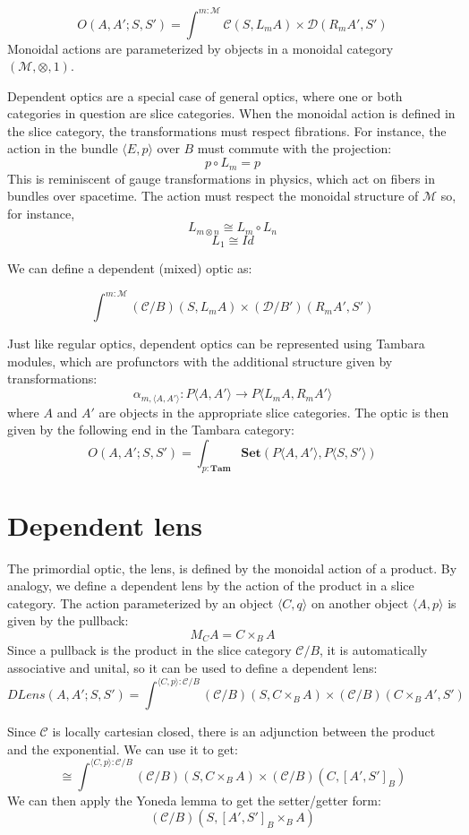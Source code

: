 \documentclass[11pt]{amsart}
\begin{document}
\[ O(A, A'; S, S') =  \int^{m \colon \mathcal{M}} \mathcal{C}( S, L_m A) \times \mathcal{D}(R_m A', S') \]
Monoidal actions are parameterized by objects in a monoidal category $(\mathcal{M}, \otimes, 1)$.

Dependent optics are a special case of general optics, where one or both categories in question are slice categories. When the monoidal action is defined in the slice category, the transformations must respect fibrations. For instance, the action in the bundle $\langle E, p \rangle$ over $B$ must commute with the projection:
\[p \circ L_m = p \]
This is reminiscent of gauge transformations in physics, which act on fibers in bundles over spacetime. The action must respect the monoidal structure of $\mathcal{M}$ so, for instance,
\[L_{m \otimes n} \cong L_m \circ L_n \]
\[ L_1 \cong \mathit{Id} \]

We can define a dependent (mixed) optic as:

\[ \int^{m : \mathcal{M}} (\mathcal{C}/B)( S, L_m A) \times (\mathcal{D}/B')(R_m A', S') \]

Just like regular optics, dependent optics can be represented using Tambara modules, which are profunctors with the additional structure given by transformations:
\[ \alpha_{m, \langle A, A' \rangle} \colon P \langle A, A' \rangle \to P\langle L_m A, R_m A' \rangle \]
where $A$ and $A'$ are objects in the appropriate slice categories.
The optic is then given by the following end in the Tambara category:
\[ O(A, A'; S, S') =  \int_{p : \mathbf{Tam}} \mathbf{Set}(P \langle A, A' \rangle, P \langle S, S' \rangle) \]


\section{Dependent lens}

The primordial optic, the lens, is defined by the monoidal action of a product. By analogy, we define a dependent lens by the action of the product in a slice category. The action parameterized by an object $\langle C, q \rangle$ on another object $ \langle A, p \rangle$ is given by the pullback:
\[ M_C A = C \times_B A \]
Since a pullback is the product in the slice category $\mathcal{C}/B$, it is automatically associative and unital, so it can be used to define a dependent lens:
\[ \mathit{DLens}(A, A'; S, S') = \int^{\langle C, p \rangle : \mathcal{C}/B} (\mathcal{C}/B)( S, C \times_B A) \times (\mathcal{C}/B)(C \times_B A', S')\]


Since $\mathcal{C}$ is locally cartesian closed, there is an adjunction between the product and the exponential. We can use it to get:
\[ \cong \int^{\langle C, p \rangle : \mathcal{C}/B} (\mathcal{C}/B)( S, C \times_B A) \times (\mathcal{C}/B)(C , [A', S']_B) \]
We can then apply the Yoneda lemma to get the setter/getter form:
\[  (\mathcal{C}/B)( S, [A', S']_B \times_B A) \]
\end{document}
